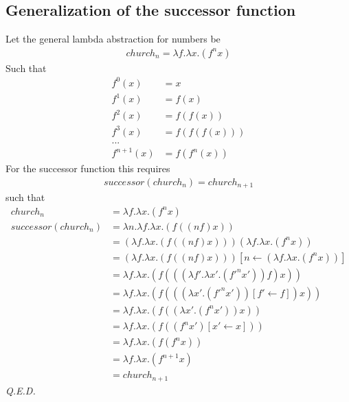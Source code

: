 \subsection{Generalization of the successor function}
Let the general lambda abstraction for numbers be
\begin{align}
			church_n = \lambda f. \lambda x. (f^{n} x) \label{e4:church:def}
\end{align}
Such that
\begin{align}
 						f^{0}(x) &= x \\
						f^{1}(x) &= f(x) \\
						f^{2}(x) &= f(f(x)) \\
						f^{3}(x) &= f(f(f(x))) \\
						... \\
					f^{n+1}(x) &= f(f^{n}(x))
\end{align}
For the successor function this requires
\begin{align}
 	successor(church_n) = church_{n+1}
\end{align}
such that
\begin{align}
					 church_n	&= \lambda f. \lambda x. (f^{n} x) \\
successor(church_n)	&= \lambda n. \lambda f. \lambda x. (f ((n f) x)) \\
										&= (\lambda f. \lambda x. (f ((n f) x))) (\lambda f. \lambda x. (f^{n} x)) \\
										&= (\lambda f. \lambda x. (f ((n f) x))) [n \leftarrow (\lambda f. \lambda x. (f^{n} x))] \\
										&= \lambda f. \lambda x. (f (((\lambda f'. \lambda x'. (f'^{n} x')) f) x)) \\
										&= \lambda f. \lambda x. (f (((\lambda x'. (f'^{n} x')) [f' \leftarrow f]) x)) \\
										&= \lambda f. \lambda x. (f ((\lambda x'. (f^{n} x')) x)) \\
										&= \lambda f. \lambda x. (f ((f^{n} x') [x' \leftarrow x])) \\
										&= \lambda f. \lambda x. (f (f^{n} x)) \\
										&= \lambda f. \lambda x. (f^{n+1} x) \\
										&= church_{n+1}
\end{align}
\emph{Q.E.D.}

